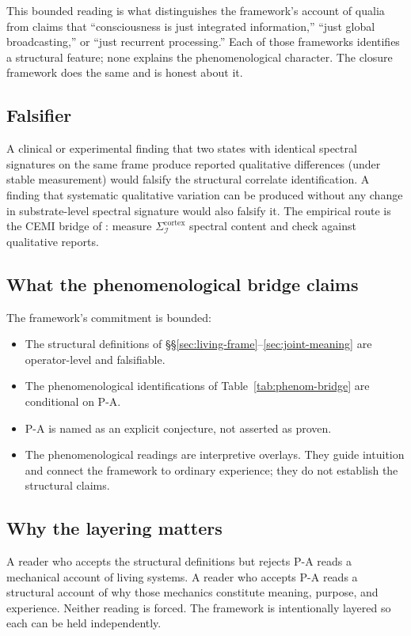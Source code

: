 \documentclass[11pt]{article}
\theoremstyle{plain}
\theoremstyle{definition}
\theoremstyle{remark}
\newcommand{\Ical}{\mathcal{I}}
\begin{document}
This bounded reading is what distinguishes the framework's account of qualia from claims that ``consciousness is just integrated information,'' ``just global broadcasting,'' or ``just recurrent processing.'' Each of those frameworks identifies a structural feature; none explains the phenomenological character. The closure framework does the same and is honest about it.

\subsection{Falsifier}

A clinical or experimental finding that two states with identical spectral signatures on the same frame produce reported qualitative differences (under stable measurement) would falsify the structural correlate identification. A finding that systematic qualitative variation can be produced without any change in substrate-level spectral signature would also falsify it. The empirical route is the CEMI bridge of \citet{SmartProcessingToPOV}: measure $\Sigma_\Ical^{\mathrm{cortex}}$ spectral content and check against qualitative reports.

\subsection{What the phenomenological bridge claims}

The framework's commitment is bounded:

\begin{itemize}[leftmargin=2em]
\item The structural definitions of \S\S\ref{sec:living-frame}--\ref{sec:joint-meaning} are operator-level and falsifiable.
\item The phenomenological identifications of Table~\ref{tab:phenom-bridge} are conditional on P-A.
\item P-A is named as an explicit conjecture, not asserted as proven.
\item The phenomenological readings are interpretive overlays. They guide intuition and connect the framework to ordinary experience; they do not establish the structural claims.
\end{itemize}

\subsection{Why the layering matters}

A reader who accepts the structural definitions but rejects P-A reads a mechanical account of living systems. A reader who accepts P-A reads a structural account of why those mechanics constitute meaning, purpose, and experience. Neither reading is forced. The framework is intentionally layered so each can be held independently.
\end{document}
